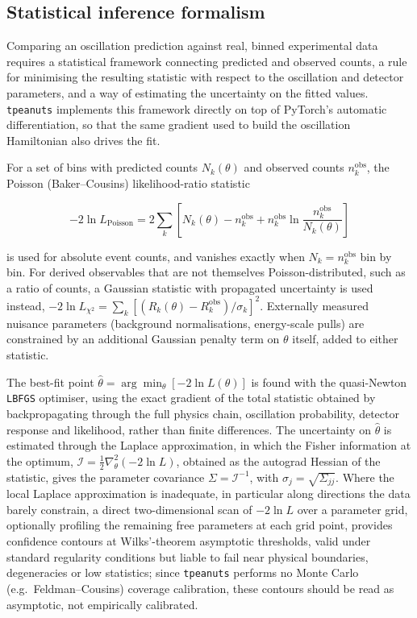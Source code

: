 \subsection{Statistical inference formalism}
\label{sec:inference-formalism}

Comparing an oscillation prediction against real, binned experimental data requires a statistical framework connecting predicted and observed counts, a rule for minimising the resulting statistic with respect to the oscillation and detector parameters, and a way of estimating the uncertainty on the fitted values. \texttt{tpeanuts} implements this framework directly on top of PyTorch's automatic differentiation, so that the same gradient used to build the oscillation Hamiltonian also drives the fit.

For a set of bins with predicted counts \(N_k(\theta)\) and observed counts \(n_k^{\mathrm{obs}}\), the Poisson (Baker--Cousins) likelihood-ratio statistic \parencite{BakerCousins1984}

\begin{equation}
  -2\ln L_{\mathrm{Poisson}} = 2\sum_k\left[N_k(\theta)-n_k^{\mathrm{obs}}+n_k^{\mathrm{obs}}\ln\frac{n_k^{\mathrm{obs}}}{N_k(\theta)}\right]
  \label{eq:poisson-nll-marco}
\end{equation}

is used for absolute event counts, and vanishes exactly when \(N_k=n_k^{\mathrm{obs}}\) bin by bin. For derived observables that are not themselves Poisson-distributed, such as a ratio of counts, a Gaussian statistic with propagated uncertainty is used instead, \(-2\ln L_{\chi^2}=\sum_k[(R_k(\theta)-R_k^{\mathrm{obs}})/\sigma_k]^2\). Externally measured nuisance parameters (background normalisations, energy-scale pulls) are constrained by an additional Gaussian penalty term on \(\theta\) itself, added to either statistic.

The best-fit point \(\hat\theta=\arg\min_\theta[-2\ln L(\theta)]\) is found with the quasi-Newton \texttt{LBFGS} optimiser, using the exact gradient of the total statistic obtained by backpropagating through the full physics chain, oscillation probability, detector response and likelihood, rather than finite differences. The uncertainty on \(\hat\theta\) is estimated through the Laplace approximation, in which the Fisher information at the optimum, \(\mathcal I=\tfrac12\nabla^2_\theta(-2\ln L)\), obtained as the autograd Hessian of the statistic, gives the parameter covariance \(\Sigma=\mathcal I^{-1}\), with \(\sigma_j=\sqrt{\Sigma_{jj}}\). Where the local Laplace approximation is inadequate, in particular along directions the data barely constrain, a direct two-dimensional scan of \(-2\ln L\) over a parameter grid, optionally profiling the remaining free parameters at each grid point, provides confidence contours at Wilks'-theorem asymptotic thresholds, valid under standard regularity conditions but liable to fail near physical boundaries, degeneracies or low statistics; since \texttt{tpeanuts} performs no Monte Carlo (e.g.\ Feldman--Cousins) coverage calibration, these contours should be read as asymptotic, not empirically calibrated.


